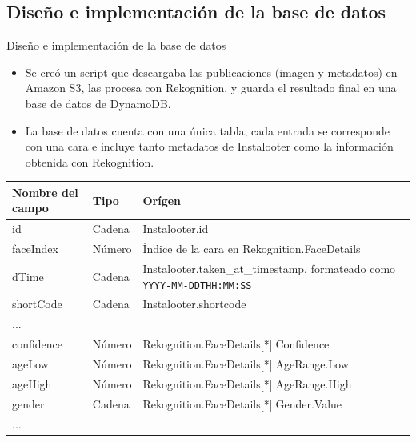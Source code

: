 \documentclass[aspectratio=149]{beamer}
\begin{document}
\subsection{Diseño e implementación de la base de datos}
\begin{frame}[label=bbdd]{Diseño e implementación de la base de datos}
    \begin{itemize}
        \item Se creó un script que descargaba las publicaciones (imagen y metadatos) en Amazon S3, las procesa con Rekognition, y guarda el resultado final en una base de datos de DynamoDB.
        \item La base de datos cuenta con una única tabla, cada entrada se corresponde con una cara e incluye tanto metadatos de Instalooter como la información obtenida con Rekognition.
    \end{itemize}

{\scriptsize
\begin{table}[H]
    \vspace{-0.4cm}
    \centering
    \begin{tabular}{|p{}|p{}|p{}|}
    \hline
	Nombre del campo & Tipo & Orígen \\ \hline
	id & Cadena & Instalooter.id \\ \hline
	faceIndex & Número & Índice de la cara en Rekognition.FaceDetails \\ \hline
	dTime & Cadena & Instalooter.taken\_at\_timestamp, formateado como \texttt{YYYY-MM-DDTHH:MM:SS} \\ \hline
	shortCode & Cadena & Instalooter.shortcode \\ \hline
	... & & \\ \hline
	confidence & Número & Rekognition.FaceDetails{[}*{]}.Confidence \\ \hline
	ageLow & Número & Rekognition.FaceDetails{[}*{]}.AgeRange.Low \\ \hline
	ageHigh & Número & Rekognition.FaceDetails{[}*{]}.AgeRange.High \\ \hline
	gender & Cadena & Rekognition.FaceDetails{[}*{]}.Gender.Value \\ \hline
	... & & \\ \hline
    \end{tabular}
    \label{tab:dynamodb_table}
\end{table}
}



\end{frame}
\end{document}
